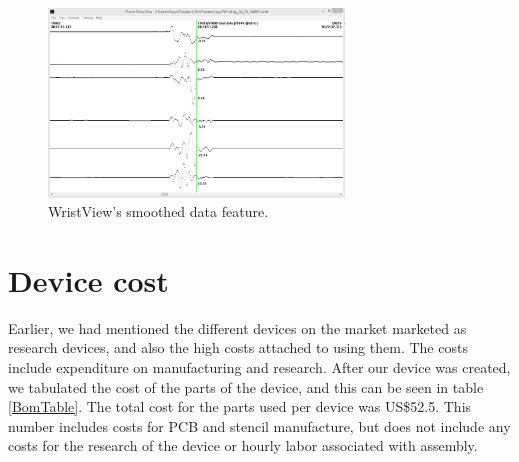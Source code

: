 \begin{figure}
\begin{center}
\includegraphics[width=0.7\textwidth]{images/WristSmooth.jpg}
\caption{WristView's smoothed data feature.}
\label{Fig:WristViewSoomth}
\end{center}
\end{figure}

\section{Device cost}
\label{Sec:DevCost}
Earlier, we had mentioned the different devices on the market marketed as research devices,
and also the high costs attached to using them.
The costs include expenditure on manufacturing and research.
After our device was created, 
we tabulated the cost of the parts of the device, and this can be seen in table \ref{BomTable}.
The total cost for the parts used per device was US\$52.5.
This number includes costs for PCB and stencil manufacture, but does not include any costs for the research of the device or hourly labor associated with assembly.

